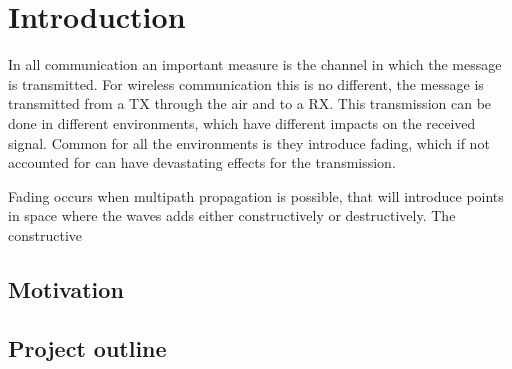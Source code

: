 \chapter{Introduction}

%

In all communication an important measure is the channel in which the message is transmitted. For wireless communication this is no different, the message is transmitted from a \gls{TX} through the air and to a \gls{RX}. This transmission can be done in different environments, which have different impacts on the received signal. Common for all the environments is they introduce fading, which if not accounted for can have devastating effects for the transmission. 

Fading occurs when multipath propagation is possible, that will introduce points in space where the waves adds either constructively or destructively. The constructive 



\section{Motivation}






\section{Project outline}





